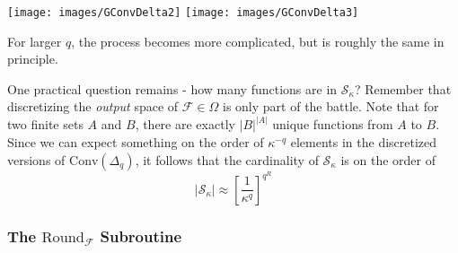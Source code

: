 \begin{center}
\texttt{[image: images/GConvDelta2]} \qquad
\texttt{[image: images/GConvDelta3]}
\end{center}

For larger $q$, the process becomes more complicated, but is roughly the same in principle.

One practical question remains - how many functions are in $\mathcal{S}_\kappa$? Remember that discretizing the \textit{output} space of $\mathcal{F} \in \Omega$ is only part of the battle. Note that for two finite sets $A$ and $B$, there are exactly $|B|^{|A|}$ unique functions from $A$ to $B$. Since we can expect something on the order of $\kappa^{-q}$ elements in the discretized versions of $\text{Conv}(\Delta_q)$, it follows that the cardinality of $\mathcal{S}_\kappa$ is on the order of
\begin{equation}
|\mathcal{S}_\kappa| \approx \left[\frac{1}{\kappa^q}\right]^{q^R}
\end{equation}

\subsubsection{The $\text{Round}_{\mathcal{F}}$ Subroutine}


